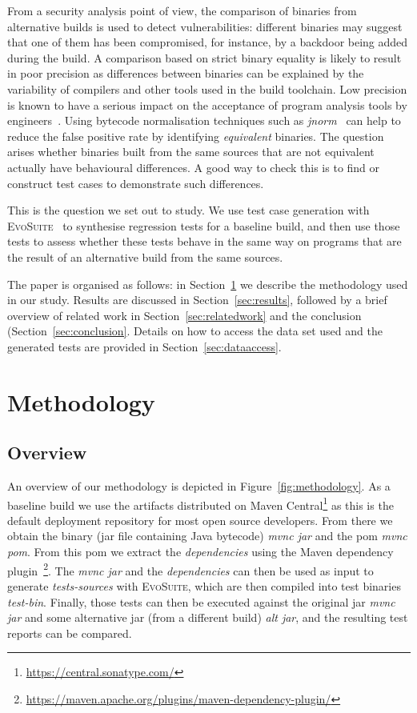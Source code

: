 \documentclass[conference]{IEEEtran}
\makeatletter
\newcommand{\evosuite}{\textsc{EvoSuite}\@\xspace}
\makeatother
\begin{document}
From a security analysis point of view, the comparison of binaries from alternative builds is used to detect vulnerabilities: different binaries may suggest that one of them has been compromised, for instance, by a backdoor being added during the build. A comparison based on strict binary equality is likely to result in poor precision as differences between binaries can be explained by the variability of compilers and other tools used in the build toolchain. Low precision is known to have a serious impact on the acceptance of program analysis tools by engineers~\cite{sadowski2018lessons,distefano2019scaling}. Using bytecode normalisation techniques such as \textit{jnorm}~\cite{schott2024JNorm} can help to reduce the false positive rate by identifying \textit{equivalent} binaries. The question arises whether binaries built from the same sources that are not equivalent actually have behavioural differences. A good way to check this is to find or construct test cases to demonstrate such differences.

This is the question we set out to study. We use test case generation with \evosuite~\cite{fraser2011evosuite} to synthesise regression tests for a baseline build, and then use those tests to assess whether these tests behave in the same way on programs that are the result of an alternative  build from the same sources. 

The paper is organised as follows: in Section~\ref{sec:methodology} we describe the methodology used in our study.  Results are discussed in Section~\ref{sec:results}, followed by a brief overview of related work in Section~\ref{sec:relatedwork} and the conclusion (Section~\ref{sec:conclusion}. Details on how to access the data set used and the generated tests are provided in Section~\ref{sec:dataaccess}. 

\section{Methodology}
\label{sec:methodology}


\subsection{Overview}

An overview of our methodology is depicted in Figure~\ref{fig:methodology}.  As a baseline build we use the artifacts distributed on Maven Central\footnote{\url{https://central.sonatype.com/}} as this is the default deployment repository for most open source developers.  From there we obtain the binary (jar file containing Java bytecode) \textit{mvnc jar} and the pom \textit{mvnc pom}. From this pom we extract the \textit{dependencies} using the Maven dependency plugin~\footnote{\url{https://maven.apache.org/plugins/maven-dependency-plugin/}}.  The \textit{mvnc jar} and the \textit{dependencies} can then be used as input to generate \textit{tests-sources} with \evosuite, which are then compiled into test binaries \textit{test-bin}.  Finally, those tests can then be executed against the original jar \textit{mvnc jar} and some alternative jar (from a different build) \textit{alt jar}, and the resulting test reports can be compared.
\end{document}
